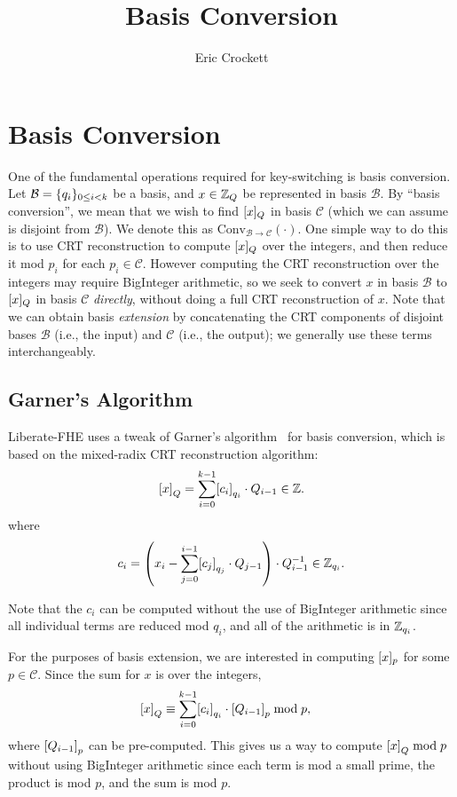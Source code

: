 \documentclass[../keyswitching.tex]{subfiles}
\title{Basis Conversion}
\author{Eric Crockett}
\begin{document}
	\ifcompileasbook
	\else
	\maketitle
	\listoffixmes
	\fi

\section{Basis Conversion}
\label{sec:basisext}
One of the fundamental operations required for key-switching is basis conversion. Let $\mathcal{B}=\set{q_i}_{0\le i< k}$ be a basis, and $x\in \Z_Q$ be represented in basis $\mathcal{B}$. By ``basis conversion'', we mean that we wish to find $\bracks{x}_Q$ in basis $\mathcal{C}$ (which we can assume is disjoint from $\mathcal{B}$). We denote this as $\mathrm{Conv}_{\mathcal{B}\rightarrow\mathcal{C}}(\cdot)$. One simple way to do this is to use CRT reconstruction to compute $\bracks{x}_Q$ over the integers, and then reduce it mod $p_i$ for each $p_i\in\mathcal{C}$. However computing the CRT reconstruction over the integers may require BigInteger arithmetic, so we seek to convert $x$ in basis $\mathcal{B}$ to $\bracks{x}_Q$ in basis $\mathcal{C}$ \emph{directly}, without doing a full CRT reconstruction of $x$. Note that we can obtain basis \emph{extension} by concatenating the CRT components of disjoint bases $\mathcal{B}$ (i.e., the input) and $\mathcal{C}$ (i.e., the output); we generally use these terms interchangeably.

\subsection{Garner's Algorithm}
Liberate-FHE uses a tweak of Garner's algorithm~\cite[Section 5.6]{geddes1992algorithms} for basis conversion, which is based on the mixed-radix CRT reconstruction algorithm:
\[\bracks*{x}_Q = \sum_{i=0}^{k-1} \bracks*{c_i}_{q_i}\cdot Q_{i-1}\in\Z.\]
where 
\[c_i = \parens*{x_i - \sum_{j=0}^{i-1} \bracks*{c_j}_{q_j}\cdot Q_{j-1}}\cdot Q_{i-1}^{-1} \in\Z_{q_i}.\]

Note that the $c_i$ can be computed without the use of BigInteger arithmetic since all individual terms are reduced mod $q_i$, and all of the arithmetic is in $\Z_{q_i}$.

For the purposes of basis extension, we are interested in computing $\bracks{x}_p$ for some $p\in\mathcal{C}$. Since the sum for $x$ is over the integers, 
\begin{align*}
	\bracks*{x}_Q &\equiv \sum_{i=0}^{k-1} \bracks*{c_i}_{q_i}\cdot \bracks*{Q_{i-1}}_p \bmod p,
\end{align*}
where $\bracks*{Q_{i-1}}_p$ can be pre-computed. This gives us a way to compute $\bracks*{x}_Q\bmod p$ without using BigInteger arithmetic since each term is mod a small prime, the product is mod $p$, and the sum is mod $p$.
\end{document}
